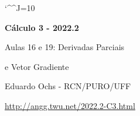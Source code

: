 \documentclass[oneside,12pt]{article}
\begin{document}
\catcode`\^^J=10
\pu
\def\pictgridstyle{\color{GrayPale}\linethickness{0.3pt}}
\def\pictaxesstyle{\linethickness{0.5pt}}
\def\pictnaxesstyle{\color{GrayPale}\linethickness{0.5pt}}
\celllower=2.5pt


\def\u#1{\par{\footnotesize \url{#1}}}

\def\drafturl{http://angg.twu.net/LATEX/2022-2-C3.pdf}
\def\drafturl{http://angg.twu.net/2022.2-C3.html}
\def\draftfooter{\tiny \href{\drafturl}{\jobname{}} \ColorBrown{\shorttoday{} \hours}}

\def\ddx{\frac{d}{dx}}
\def\ddy{\frac{d}{dy}}



%

\thispagestyle{empty}

\begin{center}

\vspace*{1.2cm}

{\bf \Large Cálculo 3 - 2022.2}

\bsk

Aulas 16 e 19: Derivadas Parciais

e Vetor Gradiente

\bsk

Eduardo Ochs - RCN/PURO/UFF

\url{http://angg.twu.net/2022.2-C3.html}

\end{center}

\newpage

\end{document}
